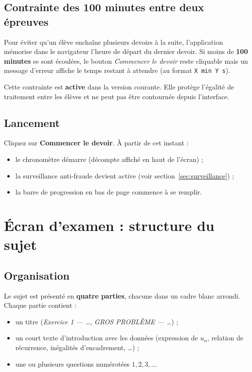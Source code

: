 \documentclass[11pt,a4paper]{article}
\begin{document}
\subsection{Contrainte des 100 minutes entre deux épreuves}

Pour éviter qu'un élève enchaîne plusieurs devoirs à la suite, l'application
mémorise dans le navigateur l'heure de départ du dernier devoir. Si moins de
\textbf{100 minutes} se sont écoulées, le bouton \emph{Commencer le devoir}
reste cliquable mais un message d'erreur affiche le temps restant à attendre
(au format \texttt{X min Y s}).

\begin{attention}
Cette contrainte est \textbf{active} dans la version courante. Elle protège
l'égalité de traitement entre les élèves et ne peut pas être contournée
depuis l'interface.
\end{attention}

\subsection{Lancement}

Cliquez sur \textbf{Commencer le devoir}. À partir de cet instant :
\begin{itemize}
  \item le chronomètre démarre (décompte affiché en haut de l'écran) ;
  \item la surveillance anti-fraude devient active (voir
        section~\ref{sec:surveillance}) ;
  \item la barre de progression en bas de page commence à se remplir.
\end{itemize}

\section{Écran d'examen : structure du sujet}

\subsection{Organisation}

Le sujet est présenté en \textbf{quatre parties}, chacune dans un cadre blanc
arrondi. Chaque partie contient :
\begin{itemize}
  \item un titre (\emph{Exercice 1 — \dots}, \emph{GROS PROBLÈME — \dots}) ;
  \item un court texte d'introduction avec les données (expression de \(u_n\),
        relation de récurrence, inégalités d'encadrement, \dots) ;
  \item une ou plusieurs questions numérotées \(1, 2, 3, \dots\)
\end{itemize}
\end{document}
